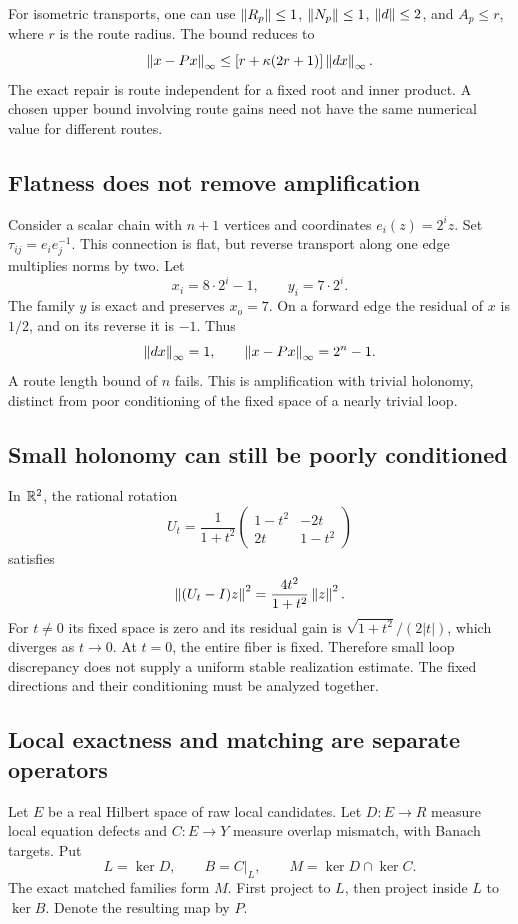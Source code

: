 For isometric transports, one can use \(\left\lVert R_p\right\rVert\le1\), \(\left\lVert N_p\right\rVert\le1\), \(\left\lVert d\right\rVert\le2\), and \(A_p\le r\), where \(r\) is the route radius. The bound reduces to
\[
 \left\lVert x-Px\right\rVert_\infty\le[r+\kappa(2r+1)]\left\lVert dx\right\rVert_\infty.
\]
The exact repair is route independent for a fixed root and inner product. A chosen upper bound involving route gains need not have the same numerical value for different routes.

\subsection{Flatness does not remove amplification}
Consider a scalar chain with \(n+1\) vertices and coordinates \(e_i(z)=2^iz\). Set \(\tau_{ij}=e_ie_j^{-1}\). This connection is flat, but reverse transport along one edge multiplies norms by two. Let
\[
 x_i=8\cdot2^i-1,\qquad y_i=7\cdot2^i.
\]
The family \(y\) is exact and preserves \(x_o=7\). On a forward edge the residual of \(x\) is \(1/2\), and on its reverse it is \(-1\). Thus
\[
 \left\lVert dx\right\rVert_\infty=1,\qquad
 \left\lVert x-Px\right\rVert_\infty=2^n-1.
\]
A route length bound of \(n\) fails. This is amplification with trivial holonomy, distinct from poor conditioning of the fixed space of a nearly trivial loop.

\subsection{Small holonomy can still be poorly conditioned}
In \(\mathbb R^2\), the rational rotation
\[
 U_t=\frac1{1+t^2}
 \begin{pmatrix}1-t^2&-2t\\2t&1-t^2\end{pmatrix}
\]
satisfies
\[
 \left\lVert(U_t-I)z\right\rVert^2=\frac{4t^2}{1+t^2}\left\lVert z\right\rVert^2.
\]
For \(t\ne0\) its fixed space is zero and its residual gain is \(\sqrt{1+t^2}/(2|t|)\), which diverges as \(t\to0\). At \(t=0\), the entire fiber is fixed. Therefore small loop discrepancy does not supply a uniform stable realization estimate. The fixed directions and their conditioning must be analyzed together.

\label{sec:quantitative}
\subsection{Local exactness and matching are separate operators}
Let \(E\) be a real Hilbert space of raw local candidates. Let \(D:E\to R\) measure local equation defects and \(C:E\to Y\) measure overlap mismatch, with Banach targets. Put
\[
 L=\ker D,\qquad B=C|_L,
 \qquad M=\ker D\cap\ker C.
\]
The exact matched families form \(M\). First project to \(L\), then project inside \(L\) to \(\ker B\). Denote the resulting map by \(P\).

